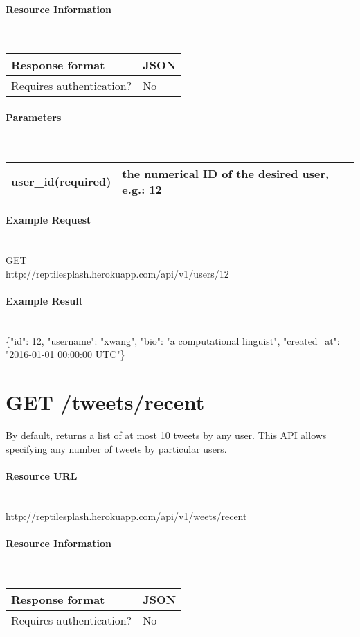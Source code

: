 \documentclass{article}
\begin{document}
	\paragraph{Resource Information} \mbox{} \\
	\begin{tabular}{ll}
		\hline
		Response format & JSON \\ \hline
		Requires authentication? & No \\ \hline
	\end{tabular}
	\paragraph{Parameters} \mbox{} \\
	\begin{tabular}{ll}
		\hline
		user\_id(required) & the numerical ID of the desired user, e.g.: 12\\ \hline
	\end{tabular}
	\paragraph{Example Request} \mbox{} \\
	GET \\
	http://reptilesplash.herokuapp.com/api/v1/users/12 
	\paragraph{Example Result} \mbox{} \\
	\{"id": 12, "username": "xwang", "bio": "a computational linguist", "created\_at": "2016-01-01 00:00:00 UTC"\}
	
	
	\section*{GET /tweets/recent}
	By default, returns a list of at most 10 tweets by any user. This API allows specifying any number of tweets by particular users. 
	\paragraph{Resource URL} \mbox{} \\
	http://reptilesplash.herokuapp.com/api/v1/weets/recent
	\paragraph{Resource Information} \mbox{} \\
	\begin{tabular}{ll}
		\hline
		Response format & JSON \\ \hline
		Requires authentication? & No \\ \hline
	\end{tabular}
\end{document}
